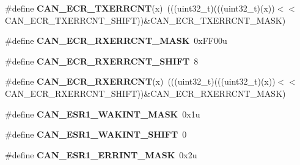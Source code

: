 \begin{DoxyCompactItemize}
\item 
\#define {\bfseries C\+A\+N\+\_\+\+E\+C\+R\+\_\+\+T\+X\+E\+R\+R\+C\+NT}(x)~(((uint32\+\_\+t)(((uint32\+\_\+t)(x))$<$$<$C\+A\+N\+\_\+\+E\+C\+R\+\_\+\+T\+X\+E\+R\+R\+C\+N\+T\+\_\+\+S\+H\+I\+FT))\&C\+A\+N\+\_\+\+E\+C\+R\+\_\+\+T\+X\+E\+R\+R\+C\+N\+T\+\_\+\+M\+A\+SK)\hypertarget{group__CAN__Register__Masks_ga64aaa4f8bafb2c1e5e79adf2acdc50fb}{}\label{group__CAN__Register__Masks_ga64aaa4f8bafb2c1e5e79adf2acdc50fb}

\item 
\#define {\bfseries C\+A\+N\+\_\+\+E\+C\+R\+\_\+\+R\+X\+E\+R\+R\+C\+N\+T\+\_\+\+M\+A\+SK}~0x\+F\+F00u\hypertarget{group__CAN__Register__Masks_gaed0f3cf7cea69b12a5166e67ad58b98e}{}\label{group__CAN__Register__Masks_gaed0f3cf7cea69b12a5166e67ad58b98e}

\item 
\#define {\bfseries C\+A\+N\+\_\+\+E\+C\+R\+\_\+\+R\+X\+E\+R\+R\+C\+N\+T\+\_\+\+S\+H\+I\+FT}~8\hypertarget{group__CAN__Register__Masks_ga8211d5f10448105a549f3f4085813922}{}\label{group__CAN__Register__Masks_ga8211d5f10448105a549f3f4085813922}

\item 
\#define {\bfseries C\+A\+N\+\_\+\+E\+C\+R\+\_\+\+R\+X\+E\+R\+R\+C\+NT}(x)~(((uint32\+\_\+t)(((uint32\+\_\+t)(x))$<$$<$C\+A\+N\+\_\+\+E\+C\+R\+\_\+\+R\+X\+E\+R\+R\+C\+N\+T\+\_\+\+S\+H\+I\+FT))\&C\+A\+N\+\_\+\+E\+C\+R\+\_\+\+R\+X\+E\+R\+R\+C\+N\+T\+\_\+\+M\+A\+SK)\hypertarget{group__CAN__Register__Masks_gadbfcb3b6cf61b7a16a75f31d40cab98c}{}\label{group__CAN__Register__Masks_gadbfcb3b6cf61b7a16a75f31d40cab98c}

\item 
\#define {\bfseries C\+A\+N\+\_\+\+E\+S\+R1\+\_\+\+W\+A\+K\+I\+N\+T\+\_\+\+M\+A\+SK}~0x1u\hypertarget{group__CAN__Register__Masks_gaebf477ebf4b3df88922476e9ac121e06}{}\label{group__CAN__Register__Masks_gaebf477ebf4b3df88922476e9ac121e06}

\item 
\#define {\bfseries C\+A\+N\+\_\+\+E\+S\+R1\+\_\+\+W\+A\+K\+I\+N\+T\+\_\+\+S\+H\+I\+FT}~0\hypertarget{group__CAN__Register__Masks_ga146781b97b78d98eb3925860a96cf217}{}\label{group__CAN__Register__Masks_ga146781b97b78d98eb3925860a96cf217}

\item 
\#define {\bfseries C\+A\+N\+\_\+\+E\+S\+R1\+\_\+\+E\+R\+R\+I\+N\+T\+\_\+\+M\+A\+SK}~0x2u\hypertarget{group__CAN__Register__Masks_ga18448e13304efd0d4fe37d26c60c3a05}{}\label{group__CAN__Register__Masks_ga18448e13304efd0d4fe37d26c60c3a05}


\end{DoxyCompactItemize}
